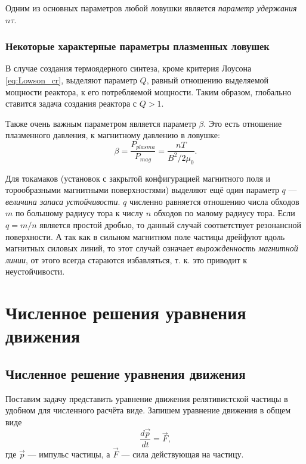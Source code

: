 Одним из основных параметров любой ловушки является \textit{параметр удержания} $n \tau$.


\subsection{Некоторые характерные параметры плазменных ловушек}

В случае создания термоядерного синтеза, кроме критерия Лоусона \eqref{eq:Lowson_cr}, выделяют параметр $Q$, равный отношению выделяемой мощности реактора, к его потребляемой мощности. Таким образом, глобально ставится задача создания реактора с $Q>1$.

Также очень важным параметром является параметр $\beta$. Это есть отношение плазменного давления, к магнитному давлению в ловушке:
\begin{equation}
\beta = \frac{P_{plasma}}{P_{mag}} = \frac{nT}{B^2/2 \mu_0}.
\end{equation}

Для токамаков (установок с закрытой конфигурацией магнитного поля и торообразными магнитными поверхностями) выделяют ещё один параметр $q$ --- \textit{величина запаса устойчивости}. $q$ численно равняется отношению числа обходов $m$ по большому радиусу тора к числу $n$ обходов по малому радиусу тора. Если $q = m/n$ является простой дробью, то данный случай соответствует резонансной поверхности. А так как в сильном магнитном поле частицы дрейфуют вдоль магнитных силовых линий, то этот случай означает \textit{вырожденность магнитной линии}, от этого всегда стараются избавляться, т. к. это приводит к неустойчивости. 


\chapter{Численное решения уравнения движения} \label{AppendixA}


\section{Численное решение уравнения движения}

Поставим задачу представить уравнение движения релятивистской частицы в удобном для численного расчёта виде. Запишем уравнение движения в общем виде
\begin{equation}
\frac{d \vec{p}}{dt} = \vec{F},
\label{eq:Newton_for_numeric}
\end{equation}
где $\vec{p}$ --- импульс частицы, а $\vec{F}$ --- сила действующая на частицу. 


